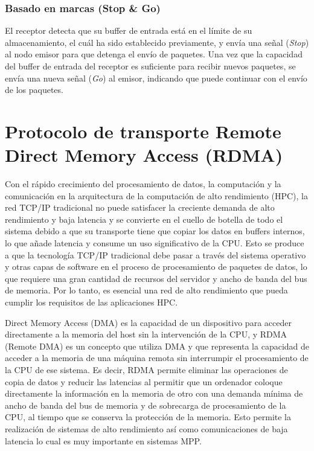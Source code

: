\subsubsection{Basado en marcas (Stop \& Go)}
El receptor detecta que su buffer de entrada está en el límite de su almacenamiento, el cuál ha sido establecido previamente, y envía una señal (\textit{Stop}) al nodo emisor para que detenga el envío de paquetes. Una vez que la capacidad del buffer de entrada del receptor es suficiente para recibir nuevos paquetes, se envía una nueva señal (\textit{Go}) al emisor, indicando que puede continuar con el envío de los paquetes.

\newpage

\section{Protocolo de transporte Remote Direct Memory Access (RDMA)}
Con el rápido crecimiento del procesamiento de datos, la computación y la comunicación en la arquitectura de la computación de alto rendimiento (HPC), la red TCP/IP tradicional no puede satisfacer la creciente demanda de alto rendimiento y baja latencia y se convierte en el cuello de botella de todo el sistema debido a que su transporte tiene que copiar los datos en buffers internos, lo que añade latencia y consume un uso significativo de la CPU. Esto se produce a que la tecnología TCP/IP tradicional debe pasar a través del sistema operativo y otras capas de software en el proceso de procesamiento de paquetes de datos, lo que requiere una gran cantidad de recursos del servidor y ancho de banda del bus de memoria. Por lo tanto, es esencial una red de alto rendimiento que pueda cumplir los requisitos de las aplicaciones HPC.

Direct Memory Access (DMA) es la capacidad de un dispositivo para acceder directamente a la memoria del host sin la intervención de la CPU, y RDMA (Remote DMA) es un concepto que utiliza DMA y que representa la capacidad de acceder a la memoria de una máquina remota sin interrumpir el procesamiento de la CPU de ese sistema. Es decir, RDMA permite eliminar las operaciones de copia de datos y reducir las latencias al permitir que un ordenador coloque directamente la información en la memoria de otro con una demanda mínima de ancho de banda del bus de memoria y de sobrecarga de procesamiento de la CPU, al tiempo que se conserva la protección de la memoria. Esto permite la realización de sistemas de alto rendimiento así como comunicaciones de baja latencia lo cual es muy importante en sistemas MPP. 

